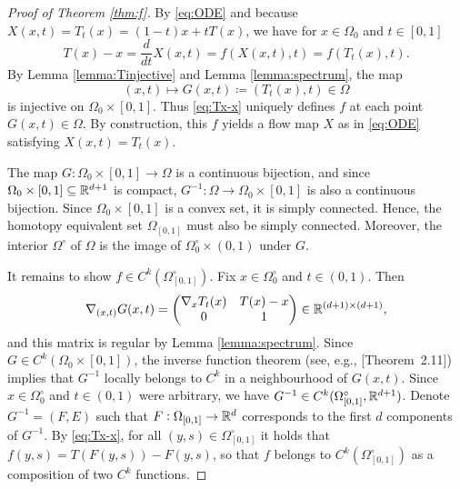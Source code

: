 \begin{proof}[Proof of Theorem \ref{thm:f}]
      By \eqref{eq:ODE} and because $X(x,t)=T_t(x)=(1-t)x+tT(x)$,
        we have for $x\in\Omega_0$ and $t\in [0,1]$
        \begin{equation}\label{eq:Tx-x}
          T(x)-x = \frac{d}{dt}X(x,t)=f(X(x,t),t)=f(T_t(x),t).
        \end{equation}
        By Lemma \ref{lemma:Tinjective} and Lemma \ref{lemma:spectrum},
        the map
        \begin{equation*}
          (x,t)\mapsto G(x,t) \coloneqq (T_t(x),t)\in\Omega
        \end{equation*}
        is injective on $\Omega_0\times [0,1]$.  Thus \eqref{eq:Tx-x}
        uniquely defines $f$ at each point $G(x,t)\in\Omega$. By
        construction, this $f$ yields a flow map $X$ as in
        \eqref{eq:ODE} satisfying $X(x,t)=T_t(x)$.


      The map $G:\Omega_0\times [0,1]\to\Omega$ is a continuous
        bijection, and since $\Omega_0\times [0,1]\subseteq\mathbb{R}^{d+1}$
        is compact, $G^{-1}:\Omega\to \Omega_0\times [0,1]$ is also a
        continuous bijection. Since $\Omega_0\times [0,1]$ is a convex
        set, it is simply connected. Hence, the homotopy equivalent
        set $\Omega_{[0,1]}$ must also be simply connected. Moreover, the
        interior $\Omega^\circ$ of $\Omega$ is the image of
        $\Omega_0^\circ\times (0,1)$ under $G$.
        
        It remains to show $f\in C^k(\Omega_{[0,1]}^\circ)$. Fix
        $x\in \Omega_0^\circ$ and $t\in (0,1)$. Then
        \begin{equation*}
          \nabla_{(x,t)}G(x,t)=\begin{pmatrix}
            \nabla_x T_t(x) & T(x) - x \\
            0 & 1
          \end{pmatrix}\in\mathbb{R}^{(d+1)\times (d+1)},
        \end{equation*}
        and this matrix is regular by Lemma
        \ref{lemma:spectrum}. Since $G\in C^k(\Omega_0\times [0,1])$,
        the inverse function theorem (see, e.g., \cite{CalculusOnManifolds}[{Theorem~2.11}]) implies
        that $G^{-1}$ locally belongs to $C^k$ in a neighbourhood of
        $G(x,t)$. Since $x\in\Omega_0^\circ$ and $t\in (0,1)$ were
        arbitrary, we have $G^{-1}\in
        C^k(\Omega_{[0,1]}^\circ,\mathbb{R}^{d+1})$. Denote $G^{-1}=(F,E)$ such that
        $F:\Omega_{[0,1]}\to\mathbb{R}^d$ corresponds to the first $d$ components of
        $G^{-1}$.  By \eqref{eq:Tx-x}, for all $(y,s)\in\Omega_{[0,1]}^\circ$
        it holds that $f(y,s)=T(F(y,s))-F(y,s)$, so that $f$ belongs to
        $C^k(\Omega_{[0,1]}^\circ)$ as a composition of two $C^k$ functions.
    \end{proof}	

